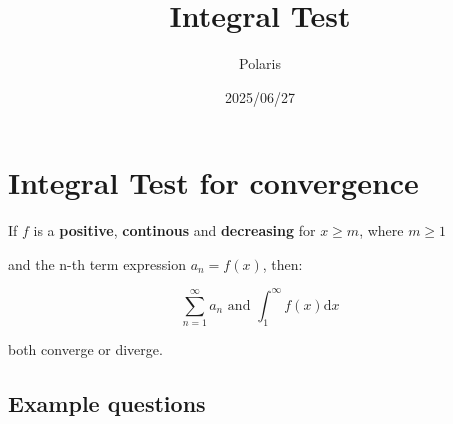 \documentclass{article}
\title{Integral Test}
\author{Polaris}
\date{2025/06/27}
\numberwithin{equation}{section}
\begin{document}
\section{Integral Test for convergence}
If $f$ is a \textbf{positive}, \textbf{continous} and \textbf{decreasing} for $x \geq m$, where $m \geq 1$

and the n-th term expression $a_n = f(x)$, then:

\begin{equation}
    \sum_{n = 1}^{\infty} a_n \text{ and } \int_{1}^{\infty} f(x) \mathrm{d}x
\end{equation}

both converge or diverge.

\subsection{Example questions}
\end{document}
